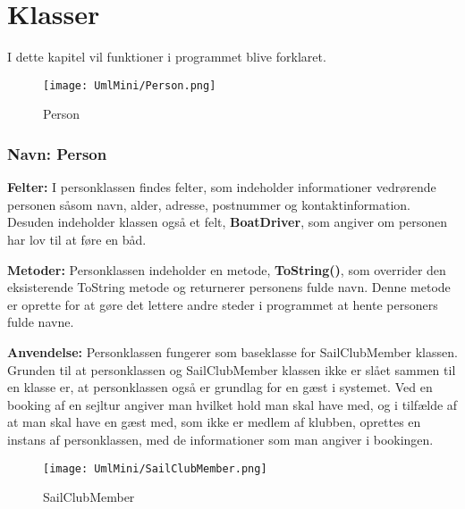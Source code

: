 \chapter{Klasser} \label{chap:klasser}

\cbstart

I dette kapitel vil funktioner i programmet blive forklaret.

\begin{wrapfigure}[9]{R}{0.25\textwidth}
    \label{img:Person}
    \vspace{-20pt}
    \begin{center}
        \texttt{[image: UmlMini/Person.png]}
    \end{center}
    \vspace{-10pt}
    \caption{Person}
\end{wrapfigure}
\subsection*{Navn: Person}

\textbf{Felter:}
I personklassen findes felter, som indeholder informationer vedrørende personen såsom navn, alder, adresse, postnummer og kontaktinformation. 
Desuden indeholder klassen også et felt, \textbf{BoatDriver}, som angiver om personen har lov til at føre en båd. 

\textbf{Metoder:}
Personklassen indeholder en metode, \textbf{ToString()}, som overrider den eksisterende ToString metode og returnerer personens fulde navn. 
Denne metode er oprette for at gøre det lettere andre steder i programmet at hente personers fulde navne.

\textbf{Anvendelse:}
Personklassen fungerer som baseklasse for SailClubMember klassen. Grunden til at personklassen og SailClubMember klassen ikke er slået sammen til en klasse er, at personklassen også er grundlag for en gæst i systemet. 
Ved en booking af en sejltur angiver man hvilket hold man skal have med, og i tilfælde af at man skal have en gæst med, som ikke er medlem af klubben, oprettes en instans af personklassen, med de informationer som man angiver i bookingen.

\begin{wrapfigure}[6]{R}{0.5\textwidth}
    \label{img:SailClubMember}
    \vspace{-30pt}
    \begin{center}
        \texttt{[image: UmlMini/SailClubMember.png]}
    \end{center}
    \vspace{-20pt}
    \caption{SailClubMember}
\end{wrapfigure}
